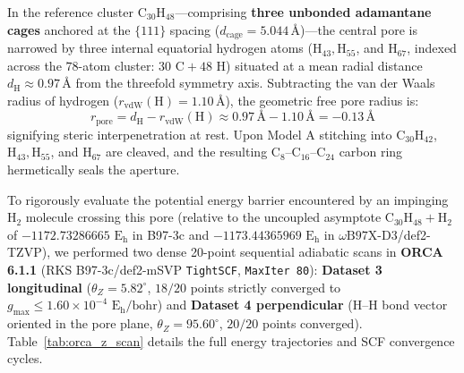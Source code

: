 \documentclass[10pt,twocolumn,a4paper]{article}
\begin{document}
In the reference cluster $\text{C}_{30}\text{H}_{48}$---comprising \textbf{three unbonded adamantane cages} anchored at the $\{111\}$ spacing ($d_{\text{cage}} = 5.044\,\text{\AA}$)---the central pore is narrowed by three internal equatorial hydrogen atoms ($\text{H}_{43}, \text{H}_{55}$, and $\text{H}_{67}$, indexed across the $78$-atom cluster: $30\text{ C} + 48\text{ H}$) situated at a mean radial distance $d_{\text{H}} \approx 0.97\,\text{\AA}$ from the threefold symmetry axis. Subtracting the van der Waals radius of hydrogen ($r_{\text{vdW}}(\text{H}) = 1.10\,\text{\AA}$), the geometric free pore radius is:
\begin{equation}
r_{\text{pore}} = d_{\text{H}} - r_{\text{vdW}}(\text{H}) \approx 0.97\,\text{\AA} - 1.10\,\text{\AA} = \mathbf{-0.13}\,\text{\AA}
\end{equation}
signifying steric interpenetration at rest. Upon Model A stitching into $\text{C}_{30}\text{H}_{42}$, $\text{H}_{43}, \text{H}_{55}$, and $\text{H}_{67}$ are cleaved, and the resulting $\text{C}_8\text{--C}_{16}\text{--C}_{24}$ carbon ring hermetically seals the aperture.

To rigorously evaluate the potential energy barrier encountered by an impinging $\text{H}_2$ molecule crossing this pore (relative to the uncoupled asymptote $\text{C}_{30}\text{H}_{48} + \text{H}_2$ of $-1172.73286665\text{ E}_\text{h}$ in B97-3c and $-1173.44365969\text{ E}_\text{h}$ in $\omega\text{B97X-D3}$/def2-TZVP), we performed two dense 20-point sequential adiabatic scans in \textbf{ORCA 6.1.1} (RKS B97-3c/def2-mSVP \texttt{TightSCF}, \texttt{MaxIter 80}): \textbf{Dataset 3 longitudinal} ($\theta_Z = 5.82^\circ$, $18/20$ points strictly converged to $g_{\max} \le 1.60 \times 10^{-4}\text{ E}_\text{h}/\text{bohr}$) and \textbf{Dataset 4 perpendicular} ($\text{H--H}$ bond vector oriented in the pore plane, $\theta_Z = 95.60^\circ$, $20/20$ points converged). Table~\ref{tab:orca_z_scan} details the full energy trajectories and SCF convergence cycles.
\end{document}
